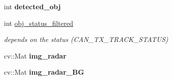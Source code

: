\begin{DoxyCompactItemize}
\item 
\hypertarget{class_radar_controller_a3167e51817e082ef4719ee3096ac924a}{}int {\bfseries detected\+\_\+obj}\label{class_radar_controller_a3167e51817e082ef4719ee3096ac924a}

\item 
\hypertarget{class_radar_controller_a66f48c02ff32145acfb7152974d2eabe}{}int \hyperlink{class_radar_controller_a66f48c02ff32145acfb7152974d2eabe}{obj\+\_\+status\+\_\+filtered}\label{class_radar_controller_a66f48c02ff32145acfb7152974d2eabe}

\begin{DoxyCompactList}\small\item\em depends on the status (C\+A\+N\+\_\+\+T\+X\+\_\+\+T\+R\+A\+C\+K\+\_\+\+S\+T\+A\+T\+U\+S) \end{DoxyCompactList}\item 
\hypertarget{class_radar_controller_a55f807e3cc67057ee533b0b62c3e2897}{}cv\+::\+Mat {\bfseries img\+\_\+radar}\label{class_radar_controller_a55f807e3cc67057ee533b0b62c3e2897}

\item 
\hypertarget{class_radar_controller_a2d1a8c95498afd084483ba8181f7857b}{}cv\+::\+Mat {\bfseries img\+\_\+radar\+\_\+\+B\+G}\label{class_radar_controller_a2d1a8c95498afd084483ba8181f7857b}

\end{DoxyCompactItemize}
